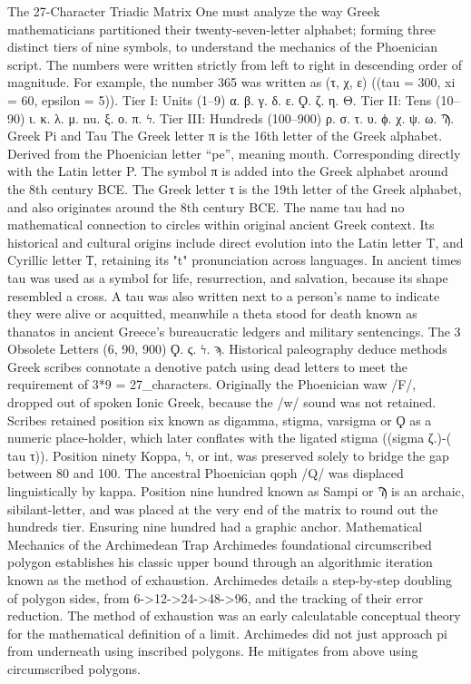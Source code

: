 The 27-Character Triadic Matrix
One must analyze the way Greek mathematicians partitioned their twenty-seven-letter alphabet; forming three distinct tiers of nine symbols, to understand the mechanics of the Phoenician script. The numbers were written strictly from left to right in descending order of magnitude. For example, the number 365 was written as (τ, χ, ε) ((tau = 300, xi = 60, epsilon = 5)).
Tier I: Units (1–9)
α.  β.  γ.  δ.  ε.  Ϙ.  ζ.  η.  Θ.
Tier II: Tens (10–90)
ι.  κ.  λ.  μ.  nu.  ξ.  ο.  π.  ϟ.    
Tier III: Hundreds (100–900)
ρ.  σ.  τ.  υ.  ϕ.  χ.  ψ.  ω.  Ϡ.
Greek Pi and Tau
The Greek letter π is the 16th letter of the Greek alphabet. Derived from the Phoenician letter “pe”, meaning mouth. Corresponding directly with the Latin letter P. The symbol π is added into the Greek alphabet around the 8th century BCE. The Greek letter τ is the 19th letter of the Greek alphabet, and also originates around the 8th century BCE. The name tau had no mathematical connection to circles within original ancient Greek context. Its historical and cultural origins include direct evolution into the Latin letter T, and Cyrillic letter Т, retaining its "t" pronunciation across languages. In ancient times tau was used as a symbol for life, resurrection, and salvation, because its shape resembled a cross. A tau was also written next to a person's name to indicate they were alive or acquitted, meanwhile a theta stood for death known as thanatos in ancient Greece’s bureaucratic ledgers and military sentencings.
The 3 Obsolete Letters (6, 90, 900)
Ϙ.  ϛ.  ϟ.   ϡ.
Historical paleography deduce methods Greek scribes connotate a denotive patch using dead letters to meet the requirement of 3*9 = 27_characters. Originally the Phoenician waw /F/, dropped out of spoken Ionic Greek, because the /w/ sound was not retained. Scribes retained position six known as digamma, stigma, varsigma or Ϙ as a numeric place-holder, which later conflates with the ligated stigma ((sigma ζ.)-( tau τ)). Position ninety Koppa, ϟ, or int, was preserved solely to bridge the gap between 80 and 100. The ancestral Phoenician qoph /Q/ was displaced linguistically by kappa. Position nine hundred known as Sampi or Ϡ is an archaic, sibilant-letter, and was placed at the very end of the matrix to round out the hundreds tier. Ensuring nine hundred had a graphic anchor.
Mathematical Mechanics of the Archimedean Trap
Archimedes foundational circumscribed polygon establishes his classic upper bound through an algorithmic iteration known as the method of exhaustion. Archimedes details a step-by-step doubling of polygon sides, from 6->12->24->48->96, and the tracking of their error reduction. The method of exhaustion was an early calculatable conceptual theory for the mathematical definition of a limit. Archimedes did not just approach pi from underneath using inscribed polygons. He mitigates from above using circumscribed polygons. 
